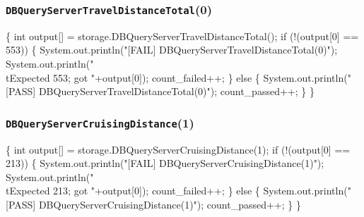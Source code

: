 \documentclass{article}
\def\nwendcode{\endtrivlist \endgroup}
\let\nwdocspar=\par
\begin{document}
\subsubsection{{\tt{}DBQueryServerTravelDistanceTotal}(0)}
\nwenddocs{}\endmoddef{}
\{
  int output[] = storage.DBQueryServerTravelDistanceTotal();
  if (!(output[0] == 553)) \{
    System.out.println("[FAIL] DBQueryServerTravelDistanceTotal(0)");
    System.out.println("\\tExpected 553; got "+output[0]);
    count_failed++;
  \} else \{
    System.out.println("[PASS] DBQueryServerTravelDistanceTotal(0)");
    count_passed++;
  \}
\}
\nwendcode{}\nwdocspar
\subsubsection{{\tt{}DBQueryServerCruisingDistance}(1)}
\nwenddocs{}\endmoddef{}
\{
  int output[] = storage.DBQueryServerCruisingDistance(1);
  if (!(output[0] == 213)) \{
    System.out.println("[FAIL] DBQueryServerCruisingDistance(1)");
    System.out.println("\\tExpected 213; got "+output[0]);
    count_failed++;
  \} else \{
    System.out.println("[PASS] DBQueryServerCruisingDistance(1)");
    count_passed++;
  \}
\}
\nwendcode{}\nwdocspar
\end{document}
